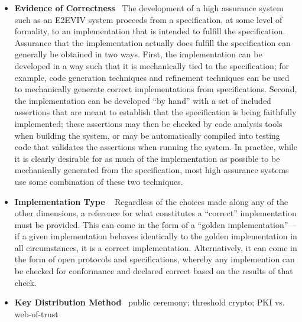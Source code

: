 \begin{itemize}
\item \textbf{Evidence of Correctness} \ The development of a high
  assurance system such as an E2EVIV system proceeds from a
  specification, at some level of formality, to an implementation that
  is intended to fulfill the specification. Assurance that the
  implementation actually does fulfill the specification can generally
  be obtained in two ways. First, the implementation can be developed
  in a way such that it is mechanically tied to the specification; for
  example, code generation techniques and refinement techniques can be
  used to mechanically generate correct implementations from
  specifications. Second, the implementation can be developed ``by
  hand'' with a set of included assertions that are meant to establish
  that the specification is being faithfully implemented; these
  assertions may then be checked by code analysis tools when building
  the system, or may be automatically compiled into testing code that
  validates the assertions when running the system. In practice, while
  it is clearly desirable for as much of the implementation as
  possible to be mechanically generated from the specification, most
  high assurance systems use some combination of these two techniques.

\item \textbf{Implementation Type} \  Regardless of the choices made along any of
  the other dimensions, a reference for what constitutes a ``correct''
  implementation must be provided. This can come in the form of a
  ``golden im\-ple\-men\-ta\-tion''---if a given implementation
  behaves identically to the golden implementation in all
  circumstances, it is a correct implementation. Alternatively, it can
  come in the form of open protocols and specifications, whereby any
  implemention can be checked for conformance and declared correct
  based on the results of that check.


\item \textbf{Key Distribution Method} \ {public ceremony; threshold
    crypto; PKI vs. web-of-trust}


\end{itemize}
